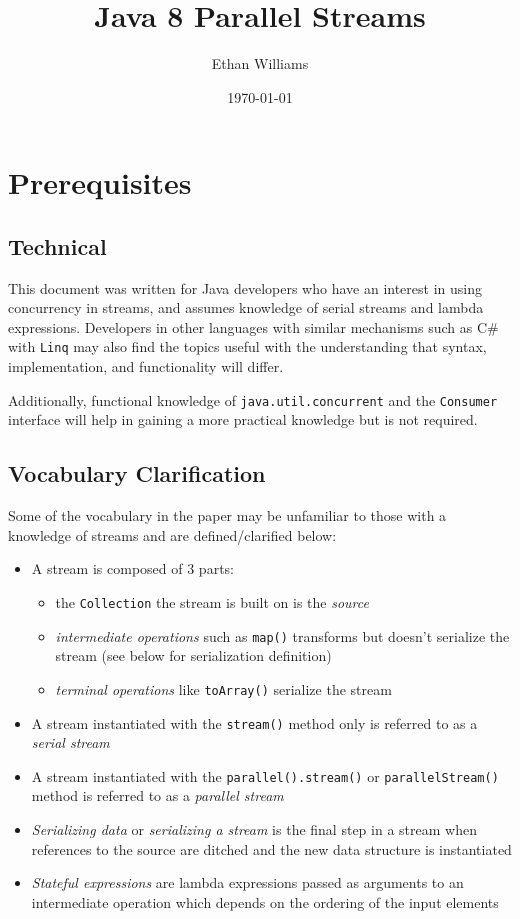 \documentclass[oneside, 12pt]{article}
\begin{document}
\title{Java 8 Parallel Streams}
\author{Ethan Williams}
\date{\today}
\maketitle

\tableofcontents

\pagebreak

\setcounter{section}{-1}
\section{Prerequisites}

\subsection{Technical}
This document was written for Java developers who have an interest in using concurrency in streams, and assumes knowledge of serial streams and lambda expressions. Developers in other languages with similar mechanisms such as C\# with \verb|Linq| may also find the topics useful with the understanding that syntax, implementation, and functionality will differ.

Additionally, functional knowledge of \verb|java.util.concurrent| and the \verb|Consumer| interface will help in gaining a more practical knowledge but is not required.

\subsection{Vocabulary Clarification} \label{language}
Some of the vocabulary in the paper may be unfamiliar to those with a knowledge of streams and are defined/clarified below:
\begin{itemize}
\item A stream is composed of 3 parts: 
	\begin{itemize}
	\item the \verb|Collection| the stream is built on is the \textit{source}
	\item \textit{intermediate operations} such as \verb|map()| transforms but doesn't serialize the stream (see below for serialization definition) 
	\item \textit{terminal operations} like \verb|toArray()| serialize the stream
	\end{itemize}
\item A stream instantiated with the \verb|stream()| method only is referred to as a \textit{serial stream}
\item A stream instantiated with the \verb|parallel().stream()| or \verb|parallelStream()| method is referred to as a \textit{parallel stream}
\item \textit{Serializing data} or \textit{serializing a stream} is the final step in a stream when references to the source are ditched and the new data structure is instantiated
\item \textit{Stateful expressions} are lambda expressions passed as arguments to an intermediate operation which depends on the ordering of the input elements
\end{itemize}
\end{document}
